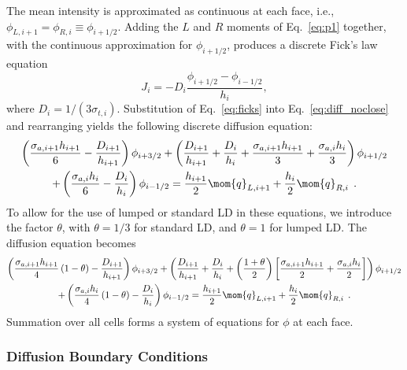The mean intensity is approximated as continuous at each face, i.e., $\phi_{L,i+1} = \phi_{R,i}
\equiv \phi_{i+1/2}$.  Adding the $L$ and $R$ moments of Eq.~\eqref{eq:p1} together, with
the continuous approximation for $\phi_{i+1/2}$, produces a discrete Fick's law equation~\cite{stacy}
\begin{equation}\label{eq:ficks}
    J_{i} = -D_i \frac{\phi_{i+1/2} - \phi_{i-1/2}}{h_i},
\end{equation}
where $D_i = 1/(3\sigma_{t,i})$.
Substitution of Eq.~\eqref{eq:ficks} into Eq.~\eqref{eq:diff_noclose} and rearranging yields the following discrete diffusion
equation:
\begin{multline}
        \left(\frac{\sigma_{a,i+1} h_{i+1}}{6} -
        \frac{D_{i+1}}{h_{i+1}}\right)\phi_{i+3/2} + \left(\frac{D_{i+1}}{h_{i+1}} +
        \frac{D_{i}}{h_i} + \frac{\sigma_{a,i+1} h_{i+1}}{3} + \frac{\sigma_{a,i}
        h_{i}}{3}\right)\phi_{i+1/2} \\ + \left(\frac{\sigma_{a,i} h_{i}}{6} -
        \frac{D_{i}}{h_{i}}\right)\phi_{i-1/2} = \frac{h_{i+1}}{2} \mom{q}_{L,i+1} +
        \frac{h_{i}}{2}\mom{q}_{R,i}\;\,. 
\end{multline}
To allow for the use of lumped
or standard LD in these equations, we introduce the factor $\theta$, with
$\theta=1/3$ for standard
LD, and $\theta=1$ for lumped LD.  The diffusion equation becomes
\begin{multline}\label{eq:dsa_lumped}
    \left(\frac{\sigma_{a,i+1} h_{i+1}}{4}\left(1 - \theta\right)  -
        \frac{D_{i+1}}{h_{i+1}}\right)\phi_{i+3/2} + \left(\frac{D_{i+1}}{h_{i+1}} +
        \frac{D_{i}}{h_i} + \left(\frac{1+\theta}{2} \right)\left[\frac{\sigma_{a,i+1} h_{i+1}}{2} + \frac{\sigma_{a,i}
        h_{i}}{2}\right]\right)\phi_{i+1/2} \\ + \left(\frac{\sigma_{a,i}
        h_{i}}{4}\left(1 - \theta\right) -
        \frac{D_{i}}{h_{i}}\right)\phi_{i-1/2} = \frac{h_{i+1}}{2} \mom{q}_{L,i+1} +
        \frac{h_{i}}{2}\mom{q}_{R,i}
        \;\,. 
\end{multline}
Summation over all cells forms a system of equations for $\phi$ at each face.  

\subsubsection{Diffusion Boundary Conditions}

